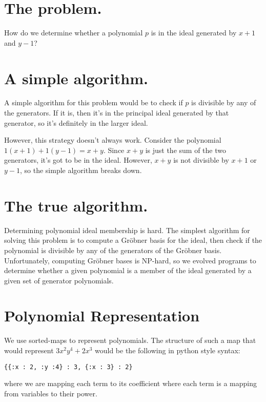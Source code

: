 \documentclass[20pt]{extarticle}
\begin{document}
\newpage
\section*{The problem.}

    How do we determine whether a polynomial $p$ is in the ideal generated by $x+1$ and $y-1$?

\newpage
\section*{A simple algorithm.}

    A simple algorithm for this problem would be to check if $p$ is divisible by any of the generators.
    If it is, then it's in the principal ideal generated by that generator, so it's definitely in the larger ideal.

    However, this strategy doesn't always work.
    Consider the polynomial $1(x+1) + 1(y-1) = x + y$.
    Since $x+y$ is just the sum of the two generators, it's got to be in the ideal.
    However, $x + y$ is not divisible by $x+1$ or $y-1$, so the simple algorithm breaks down.

\newpage
\section*{The true algorithm.}

    Determining polynomial ideal membership is hard.
    The simplest algorithm for solving this problem is to compute a Gr\"obner basis for the ideal, then check if the polynomial is divisible by any of the generators of the Gr\"obner basis.
    Unfortunately, computing Gr\"obner bases is NP-hard, so we evolved programs to determine whether a given polynomial is a member of the ideal generated by a given set of generator polynomials.

\newpage
\section*{Polynomial Representation}

We use sorted-maps to represent polynomials. The structure of such a map that would represent $3x^2y^4 + 2x^3$ would be the following in python style syntax:

\begin{verbatim}
{{:x : 2, :y :4} : 3, {:x : 3} : 2}
\end{verbatim}

where we are mapping each term to its coefficient where each term is a mapping from variables to their power.
\end{document}
